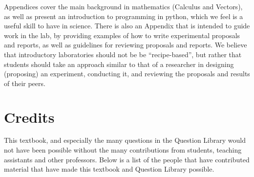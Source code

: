 Appendices cover the main background in mathematics (Calculus and Vectors), as well as present an introduction to programming in python, which we feel is a useful skill to have in science. There is also an Appendix that is intended to guide work in the lab, by providing examples of how to write experimental proposals and reports, as well as guidelines for reviewing proposals and reports. We believe that introductory laboratories should not be be ``recipe-based'', but rather that students should take an approach similar to that of a researcher in designing (proposing) an experiment, conducting it, and reviewing the proposals and results of their peers.

\section*{Credits}
This textbook, and especially the many questions in the Question Library would not have been possible without the many contributions from students, teaching assistants and other professors. Below is a list of the people that have contributed material that have made this textbook and Question Library possible.

